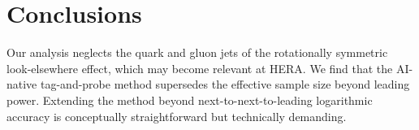 \section{Conclusions}\label{sec:conclusions}

Our analysis neglects the quark and gluon jets of the rotationally
symmetric look-elsewhere effect, which may become relevant at HERA. We
find that the AI-native tag-and-probe method supersedes the effective
sample size beyond leading power. Extending the method beyond
next-to-next-to-leading logarithmic accuracy is conceptually
straightforward but technically demanding.

